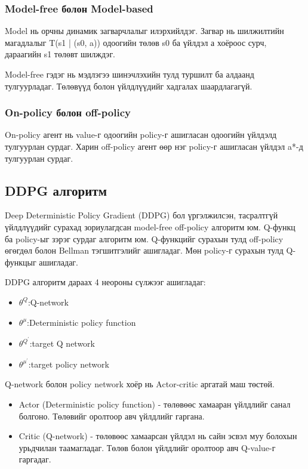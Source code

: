 \documentclass[12pt,A4]{report}
\begin{document}
\subsubsection{Model-free болон Model-based}

Model нь орчны динамик загварчлалыг илэрхийлдэг. Загвар нь шилжилтийн магадлалыг T(s1 | (s0, a)) одоогийн төлөв s0 ба үйлдэл а хоёроос  сурч, дараагийн s1 төлөвт шилждэг.

Model-free гэдэг нь мэдлэгээ шинэчлэхийн тулд туршилт ба алдаанд тулгуурладаг. Төлөвүүд болон үйлдлүүдийг хадгалах шаардлагагүй. 

\subsubsection{On-policy болон off-policy}

On-policy агент нь value-г одоогийн policy-г ашигласан одоогийн үйлдэлд тулгуурлан сурдаг. Харин off-policy агент өөр нэг policy-г ашигласан үйлдэл a*-д тулгуурлан сурдаг.

\subsection{DDPG алгоритм}

Deep Deterministic Policy Gradient (DDPG) бол үргэлжилсэн, тасралтгүй үйлдлүүдийг сурахад зориулагдсан model-free off-policy алгоритм юм. Q-функц ба policy-ыг зэрэг сурдаг алгоритм юм. Q-функцийг сурахын тулд off-policy өгөгдөл болон Bellman тэгшитгэлийг ашигладаг. Мөн policy-г сурахын тулд Q-функцыг ашигладаг. 

DDPG алгоритм дараах 4 неороны сүлжээг ашигладаг:
\begin{itemize}
	\item ${\theta}^Q$:Q-network
	\item ${\theta}^{\mu}$:Deterministic policy function
	\item ${\theta}^{Q^{'}}$:target Q network
	\item ${\theta}^{{\mu}^{'}}$:target policy network
\end{itemize} 
 
 Q-network болон policy network хоёр нь Actor-critic аргатай маш төстөй. 
 
\begin{itemize}
	\item Actor (Deterministic policy function) - төлөвөөс хамааран үйлдлийг санал болгоно. Төлөвийг оролтоор авч үйлдлийг гаргана.
	\item Critic (Q-network) - төлөвөөс хамаарсан үйлдэл нь сайн эсвэл муу болохын урьдчилан таамагладаг. Төлөв болон үйлдлийг оролтоор авч Q-value-г гаргадаг.
\end{itemize}
\end{document}
